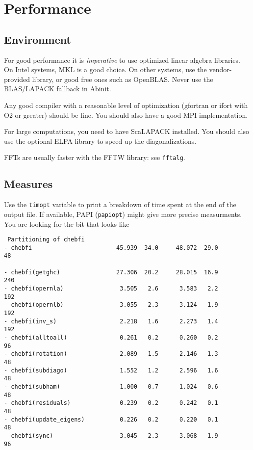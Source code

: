 \documentclass[11pt]{article}
\begin{document}
\section{Performance}
\subsection{Environment}
For good performance it is \emph{imperative} to use optimized linear
algebra libraries. On Intel systems, MKL is a good choice. On other
systems, use the vendor-provided library, or good free ones such as
OpenBLAS. Never use the BLAS/LAPACK fallback in Abinit.

Any good compiler with a reasonable level of optimization (gfortran or
ifort with O2 or greater) should be fine. You should also have a good
MPI implementation.

For large computations, you need to have ScaLAPACK installed. You
should also use the optional ELPA library to speed up the
diagonalizations.

FFTs are usually faster with the FFTW library: see \texttt{fftalg}.
\subsection{Measures}
Use the \texttt{timopt} variable to print a breakdown of time spent at
the end of the output file. If available, PAPI (\texttt{papiopt})
might give more precise measurments. You are looking for the bit that
looks like
\begin{verbatim}
 Partitioning of chebfi
- chebfi                        45.939  34.0     48.072  29.0             48
 
- chebfi(getghc)                27.306  20.2     28.015  16.9            240
- chebfi(opernla)                3.505   2.6      3.583   2.2            192
- chebfi(opernlb)                3.055   2.3      3.124   1.9            192
- chebfi(inv_s)                  2.218   1.6      2.273   1.4            192
- chebfi(alltoall)               0.261   0.2      0.260   0.2             96
- chebfi(rotation)               2.089   1.5      2.146   1.3             48
- chebfi(subdiago)               1.552   1.2      2.596   1.6             48
- chebfi(subham)                 1.000   0.7      1.024   0.6             48
- chebfi(residuals)              0.239   0.2      0.242   0.1             48
- chebfi(update_eigens)          0.226   0.2      0.220   0.1             48
- chebfi(sync)                   3.045   2.3      3.068   1.9             96
\end{verbatim}
\end{document}
